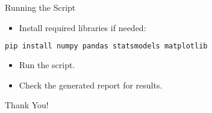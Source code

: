 \documentclass[aspectratio=169]{beamer}
\begin{document}
\begin{frame}[fragile]{Running the Script}
  \begin{itemize}
    \item Install required libraries if needed:
  \end{itemize}
  \vspace{0.5cm} %
  \begin{lstlisting}[language=bash]
pip install numpy pandas statsmodels matplotlib
  \end{lstlisting}
  \vspace{0.5cm} %
  \begin{itemize}
    \item Run the script.
    \item Check the generated report for results.
  \end{itemize}
\end{frame}

\begin{frame}
  \centering
  \Huge Thank You!
  \vspace{1cm}
\end{frame}
\end{document}
